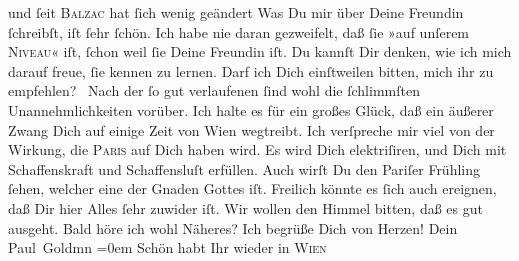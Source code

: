 \begin{ledgroupsized}[t]{13cm}
               und ſeit \textsc{Balzac} hat ſich wenig geändert{\dotsseven}\pend
           \pstart
           Was Du mir über Deine Freundin ſchreibſt, iſt ſehr ſchön. Ich habe nie daran gezweifelt, daß ſie
               »auf unſerem \textsc{Niveau}« iſt, ſchon weil ſie Deine Freundin iſt. Du kannſt Dir
               denken, wie ich mich darauf freue, ſie kennen zu lernen. Darf ich Dich einſtweilen
               bitten, mich ihr zu empfehlen? {\dotsfour}\pend
           \pstart
           Nach der ſo gut verlaufenen \label{K_L02805-6v}\label{K_L02805-6h} ſind wohl die ſchlimmſten Unannehmlichkeiten vorüber. Ich halte es für ein
               großes Glück, daß ein äußerer Zwang Dich auf einige Zeit von Wien wegtreibt. Ich verſpreche mir viel von der Wirkung, die \textsc{Paris} auf Dich haben wird. Es wird Dich elektriſiren, und Dich mit Schaffenskraft und
               Schaffensluſt erfüllen. Auch wirſt Du den Pariſer
               Frühling ſehen, welcher eine der Gnaden Gottes iſt.\pend
           \pstart
           Freilich könnte es ſich auch ereignen, daß Dir hier Alles ſehr zuwider iſt.\pend
           \pstart
           {\pb}Wir wollen den Himmel bitten, daß es gut
               ausgeht.\pend
           \pstart
           Bald höre ich wohl Näheres?\pend
           \pstart
           Ich begrüße Dich von Herzen!\pend
           \pstart
           Dein {\\[\baselineskip]}\spacefill\mbox{Paul Goldmn}\pend
           \leftskip=0em{}\pstart
           \noindent{}Schön habt Ihr wieder in \textsc{Wien}{ }\label{K_L02805-7v}
\end{ledgroupsized}
